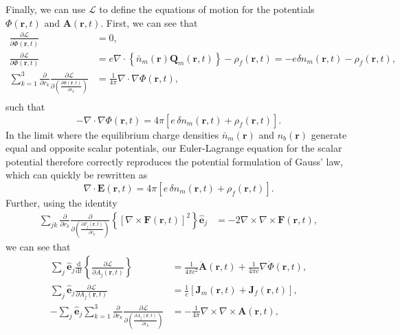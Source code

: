 \documentclass{article}
\begin{document}
Finally, we can use $\mathcal{L}$ to define the equations of motion for the potentials $\Phi(\mathbf{r},t)$ and $\mathbf{A}(\mathbf{r},t)$. First, we can see that 
\begin{equation}
\begin{split}
\frac{\partial\mathcal{L}}{\partial\dot{\Phi}(\mathbf{r},t)} &= 0,\\
\frac{\partial \mathcal{L}}{\partial \Phi(\mathbf{r},t)} &= e\nabla\cdot\left\{\bar{n}_m(\mathbf{r})\mathbf{Q}_m(\mathbf{r},t)\right\} - \rho_f(\mathbf{r},t) = -e\delta n_m(\mathbf{r},t) - \rho_f(\mathbf{r},t),\\
\sum_{k = 1}^3\frac{\partial}{\partial r_k}\frac{\partial \mathcal{L}}{\partial\left(\frac{\partial\Phi(\mathbf{r},t)}{\partial r_k}\right)} &= \frac{1}{4\pi}\nabla\cdot\nabla\Phi(\mathbf{r},t),\\
\end{split}
\end{equation}
such that
\begin{equation}\label{eq:poisson1}
-\nabla\cdot\nabla\Phi(\mathbf{r},t) = 4\pi\left[e\,\delta n_m(\mathbf{r},t) + \rho_f(\mathbf{r},t)\right].
\end{equation}
In the limit where the equilibrium charge densities $\bar{n}_m(\mathbf{r})$ and $n_b(\mathbf{r})$ generate equal and opposite scalar potentials, our Euler-Lagrange equation for the scalar potential therefore correctly reproduces the potential formulation of Gauss' law, which can quickly be rewritten as
\begin{equation}
\nabla\cdot\mathbf{E}(\mathbf{r},t) = 4\pi\left[e\,\delta n_m(\mathbf{r},t) + \rho_f(\mathbf{r},t)\right].
\end{equation}
Further, using the identity
\begin{equation}
\begin{split}
\sum_{jk}\frac{\partial}{\partial r_k}\frac{\partial}{\partial\!\left(\frac{\partial F_j(\mathbf{r},t)}{\partial r_k}\right)}\left\{\left[\nabla\times\mathbf{F}(\mathbf{r},t)\right]^2\right\}\hat{\mathbf{e}}_j &= -2\nabla\times\nabla\times\mathbf{F}(\mathbf{r},t),
\end{split}
\end{equation}
we can see that
\begin{equation}
\begin{split}
\sum_j\hat{\mathbf{e}}_j\frac{\mathrm{d}}{\mathrm{d}t}\left\{\frac{\partial\mathcal{L}}{\partial \dot{A}_j(\mathbf{r},t)}\right\} &= \frac{1}{4\pi c^2}\ddot{\mathbf{A}}(\mathbf{r},t) + \frac{1}{4\pi c}\nabla\dot{\Phi}(\mathbf{r},t),\\
\sum_j\hat{\mathbf{e}}_j\frac{\partial\mathcal{L}}{\partial A_j(\mathbf{r},t)} &= \frac{1}{c}\left[\mathbf{J}_m(\mathbf{r},t) + \mathbf{J}_f(\mathbf{r},t)\right],\\
-\sum_j\hat{\mathbf{e}}_j\sum_{k = 1}^3\frac{\partial}{\partial r_k}\frac{\partial \mathcal{L}}{\partial\!\left(\frac{\partial A_{j}(\mathbf{r},t)}{\partial r_k}\right)} &= -\frac{1}{4\pi}\nabla\times\nabla\times\mathbf{A}(\mathbf{r},t),
\end{split}
\end{equation}
\end{document}
